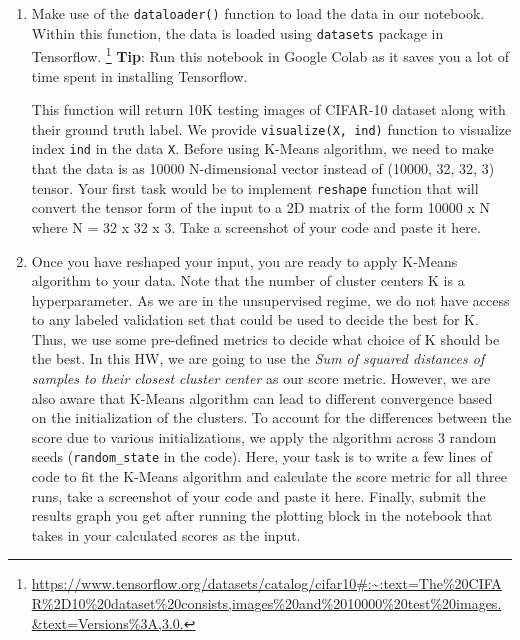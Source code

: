 \documentclass[11pt]{article}
\begin{document}
\begin{enumerate}
\item {} Make use of the \verb|dataloader()| function to load the data in our notebook. Within this function, the data is loaded using \verb|datasets| package in Tensorflow. \footnote{\url{https://www.tensorflow.org/datasets/catalog/cifar10#:~:text=The\%20CIFAR\%2D10\%20dataset\%20consists,images\%20and\%2010000\%20test\%20images.\&text=Versions\%3A,3.0.}} \textbf{Tip}: Run this notebook in Google Colab as it saves you a lot of time spent in installing Tensorflow.

This function will return 10K testing images of CIFAR-10 dataset along with their ground truth label. We provide \verb|visualize(X, ind)| function to visualize index \verb|ind| in the data \verb|X|. Before using K-Means algorithm, we need to make that the data is as 10000 N-dimensional vector instead of (10000, 32, 32, 3) tensor. Your first task would be to implement \verb|reshape| function that will convert the tensor form of the input to a 2D matrix of the form 10000 x N where N = 32 x 32 x 3. Take a screenshot of your code and paste it here. \hfill 
\vspace{4cm}

\item {} Once you have reshaped your input, you are ready to apply K-Means algorithm to your data. Note that the number of cluster centers K is a hyperparameter. As we are in the unsupervised regime, we do not have access to any labeled validation set that could be used to decide the best for K. Thus, we use some pre-defined metrics to decide what choice of K should be the best. In this HW, we are going to use the \textit{Sum of squared distances of samples to their closest cluster center} as our score metric. However, we are also aware that K-Means algorithm can lead to different convergence based on the initialization of the clusters. To account for the differences between the score due to various initializations, we apply the algorithm across 3 random seeds (\verb|random_state| in the code). Here, your task is to write a few lines of code to fit the K-Means algorithm and calculate the score metric for all three runs, take a screenshot of your code and paste it here. Finally, submit the results graph you get after running the plotting block in the notebook that takes in your calculated scores as the input.\hfill 
\vspace{5cm}
\end{enumerate}
\end{document}
